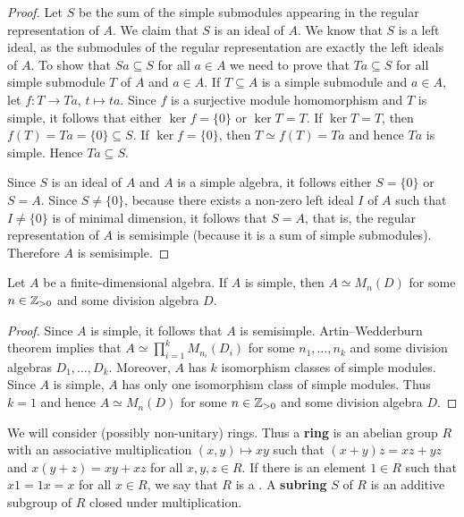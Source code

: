 \begin{proof}
	Let $S$ be the sum of the simple submodules appearing in the regular representation of $A$. 
	We claim that $S$ is an ideal of $A$. We know that $S$ is a left ideal, as the submodules of the regular representation
	are exactly the left ideals of $A$. To show that $Sa\subseteq S$ for all $a\in A$ we need to prove that 
	$Ta\subseteq S$ for all simple submodule $T$ of $A$ and $a\in A$. 
	If $T\subseteq A$ is a simple submodule and $a\in A$, 
	let $f\colon T\to Ta$, $t\mapsto ta$. Since $f$ is a surjective 
	module homomorphism and $T$ is simple, it follows that
	either $\ker f=\{0\}$ or $\ker T=T$. If $\ker T=T$, then 
	$f(T)=Ta=\{0\}\subseteq S$. If $\ker f=\{0\}$, then $T\simeq f(T)=Ta$ and hence $Ta$ is simple. Hence $Ta\subseteq S$. 
	
	Since $S$ is an ideal of $A$ and $A$
	is a simple algebra, it follows either $S=\{0\}$ or $S=A$.  Since $S\ne\{0\}$, because  
	there exists a non-zero left ideal $I$ of $A$ such that $I\ne\{0\}$ is of minimal dimension, 
	it follows that $S=A$, that is, the regular representation of $A$ is semisimple (because it is a sum of simple submodules). Therefore 
	$A$ is semisimple. 
\end{proof}

\begin{theorem}[Wedderburn]
	Let $A$ be a finite-dimensional algebra. If $A$ is simple, then 
	$A\simeq M_n(D)$ for some $n\in\mathbb{Z}_{>0}$ and some division algebra $D$. 
\end{theorem}

\begin{proof}
	Since $A$ is simple, it follows that $A$ is semisimple. Artin--Wedderburn theorem implies that $A\simeq\prod_{i=1}^k M_{n_i}(D_i)$ 
	for some $n_1,\dots,n_k$ and some division algebras $D_1,\dots,D_k$. Moreover, $A$ has 
	$k$ isomorphism classes of simple modules. Since $A$ is simple,
	$A$ has only one isomorphism class of simple modules. Thus $k=1$ and hence 
	$A\simeq M_n(D)$ for some $n\in\mathbb{Z}_{>0}$ and some division algebra $D$. 
\end{proof}

\label{Primitive rings}

We will consider (possibly non-unitary) rings. Thus  
a \textbf{ring} is an abelian group $R$ with an associative multiplication 
$(x,y)\mapsto xy$ such that $(x+y)z=xz+yz$ and $x(y+z)=xy+xz$ for all $x,y,z\in
R$. If there is an element $1\in R$ such that $x1=1x=x$ for all $x\in R$, we 
say that $R$ is a .  A \textbf{subring} $S$ of $R$ is an additive
subgroup of $R$ closed under multiplication. 

